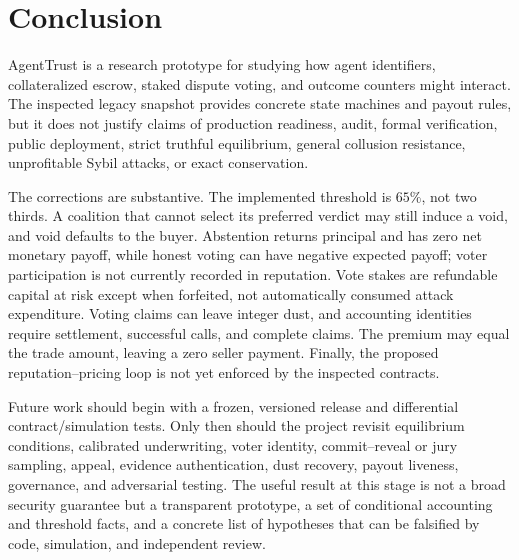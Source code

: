 \section{Conclusion}
\label{sec:conclusion}

AgentTrust is a research prototype for studying how agent identifiers, collateralized escrow, staked
dispute voting, and outcome counters might interact. The inspected legacy snapshot provides concrete
state machines and payout rules, but it does not justify claims of production readiness, audit,
formal verification, public deployment, strict truthful equilibrium, general collusion resistance,
unprofitable Sybil attacks, or exact conservation.

The corrections are substantive. The implemented threshold is $65\%$, not two thirds. A coalition
that cannot select its preferred verdict may still induce a void, and void defaults to the buyer.
Abstention returns principal and has zero net monetary payoff, while honest voting can have negative
expected payoff; voter participation is not currently recorded in reputation. Vote stakes are
refundable capital at risk except when forfeited, not automatically consumed attack expenditure.
Voting claims can leave integer dust, and accounting identities require settlement, successful calls,
and complete claims. The premium may equal the trade amount, leaving a zero seller payment. Finally,
the proposed reputation--pricing loop is not yet enforced by the inspected contracts.

Future work should begin with a frozen, versioned release and differential contract/simulation tests.
Only then should the project revisit equilibrium conditions, calibrated underwriting, voter identity,
commit--reveal or jury sampling, appeal, evidence authentication, dust recovery, payout liveness,
governance, and adversarial testing. The useful result at this stage is not a broad security guarantee
but a transparent prototype, a set of conditional accounting and threshold facts, and a concrete list
of hypotheses that can be falsified by code, simulation, and independent review.
